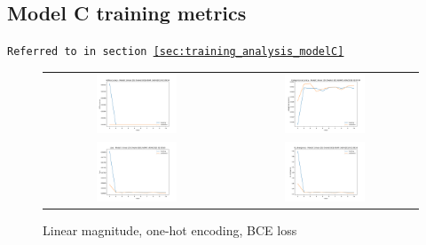 \begin{appendices}
        \subsection{Model C training metrics}
        \label{app:modelC_training}
        \texttt{Referred to in section \ref{sec:training_analysis_modelC}}
        \begin{figure}[H]
            \centering
            \begin{tabular}{cc}
                \includegraphics[width=0.45\textwidth]{figures/training_plots/ModelC-(linear_2D)-OneHot-BCE-ADAM_14-04-2019_02-09-59_AON-accuracy.pdf} & \includegraphics[width=0.45\textwidth]{figures/training_plots/ModelC-(linear_2D)-OneHot-BCE-ADAM_14-04-2019_02-09-59_categorical-accuracy.pdf} \\
                \includegraphics[width=0.45\textwidth]{figures/training_plots/ModelC-(linear_2D)-OneHot-BCE-ADAM_14-04-2019_02-09-59_loss.pdf} & \includegraphics[width=0.45\textwidth]{figures/training_plots/ModelC-(linear_2D)-OneHot-BCE-ADAM_14-04-2019_02-09-59_KL-divergence.pdf}
            \end{tabular}
            \caption*{Linear magnitude, one-hot encoding, BCE loss}
        \end{figure}
        

\end{appendices}
